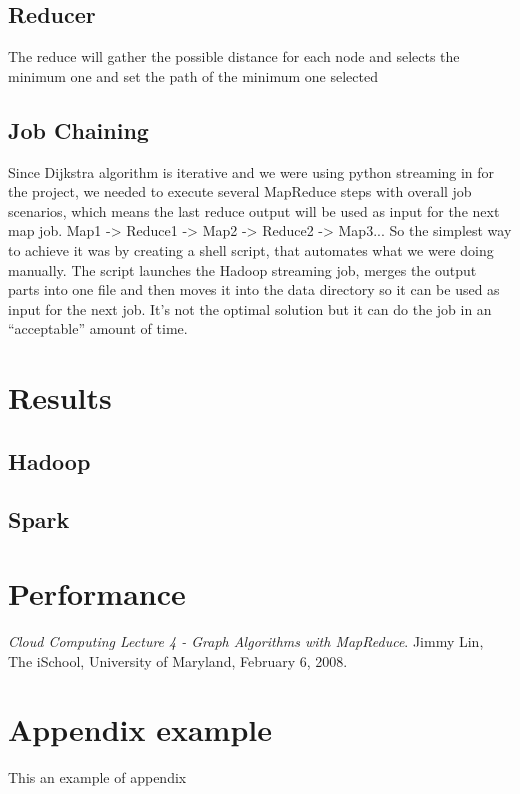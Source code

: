 \documentclass[english]{article}
\begin{document}
\newpage
\subsection{Reducer}
The reduce will gather the possible distance for each node and selects the minimum one and set the path of the minimum one selected

\subsection{Job Chaining}
Since Dijkstra algorithm is iterative and we were using python streaming in for the project, we needed to execute several MapReduce steps with overall job scenarios, which means the last reduce output will be used as input for the next map job.
Map1 -> Reduce1 -> Map2 -> Reduce2 -> Map3...
So the simplest way to achieve it was by creating a shell script, that automates what we were doing manually.
The script launches the Hadoop streaming job, merges the output parts into one file and then moves it into the data directory so it can be used as input for the next job.
It’s not the optimal solution but it can do the job in an “acceptable” amount of time.

\section{Results}

\subsection{Hadoop}

\subsection{Spark}

\section{Performance}

\newpage

\begin{thebibliography}{9}
 \textit{Cloud Computing Lecture 4 - Graph Algorithms with MapReduce}. Jimmy Lin, The iSchool, University of Maryland, February 6, 2008.
\end{thebibliography}
\newpage
\appendix
\section{Appendix example}
This an example of appendix
\end{document}
